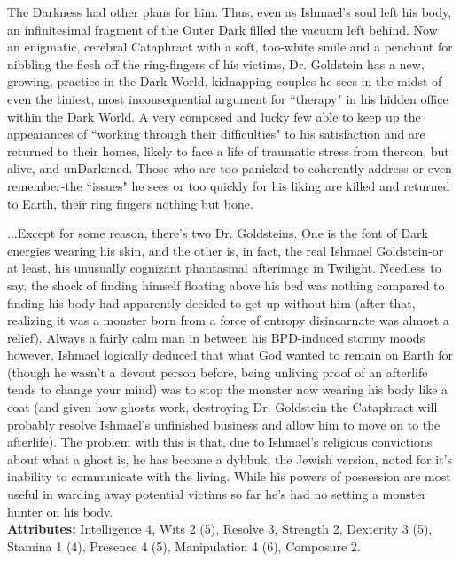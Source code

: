 The Darkness had other plans for him. Thus, even as Ishmael's soul left his body, an infinitesimal fragment of the Outer Dark filled the vacuum left behind. Now an enigmatic, cerebral Cataphract with a soft, too-white smile and a penchant for nibbling the flesh off the ring-fingers of his victims, Dr. Goldstein has a new, growing, practice in the Dark World, kidnapping couples he sees in the midst of even the tiniest, most inconsequential argument for \textquotedblleft therapy" in his hidden office within the Dark World. A very composed and lucky few able to keep up the appearances of \textquotedblleft working through their difficulties" to his satisfaction and are returned to their homes, likely to face a life of traumatic stress from thereon, but alive, and unDarkened. Those who are too panicked to coherently address-or even remember-the \textquotedblleft issues" he sees or too quickly for his liking are killed and returned to Earth, their ring fingers nothing but bone.

...Except for some reason, there's two Dr. Goldsteins. One is the font of Dark energies wearing his skin, and the other is, in fact, the real Ishmael Goldstein-or at least, his unusually cognizant phantasmal afterimage in Twilight. Needless to say, the shock of finding himself floating above his bed was nothing compared to finding his body had apparently decided to get up without him (after that, realizing it was a monster born from a force of entropy disincarnate was almost a relief). Always a fairly calm man in between his BPD-induced stormy moods however, Ishmael logically deduced that what God wanted to remain on Earth for (though he wasn't a devout person before, being unliving proof of an afterlife tends to change your mind) was to stop the monster now wearing his body like a coat (and given how ghosts work, destroying Dr. Goldstein the Cataphract will probably resolve Ishmael's unfinished business and allow him to move on to the afterlife). The problem with this is that, due to Ishmael's religious 
convictions about what a ghost is, he has become a dybbuk, the Jewish version, noted for it's inability to communicate with the living. While his powers of possession are most useful in warding away potential victims so far he's had no setting a monster hunter on his body.\\


\noindent \textbf{Attributes:} Intelligence 4, Wits 2 (5), Resolve 3, Strength 2, Dexterity 3 (5), Stamina 1 (4), Presence 4 (5), Manipulation 4 (6), Composure 2.

